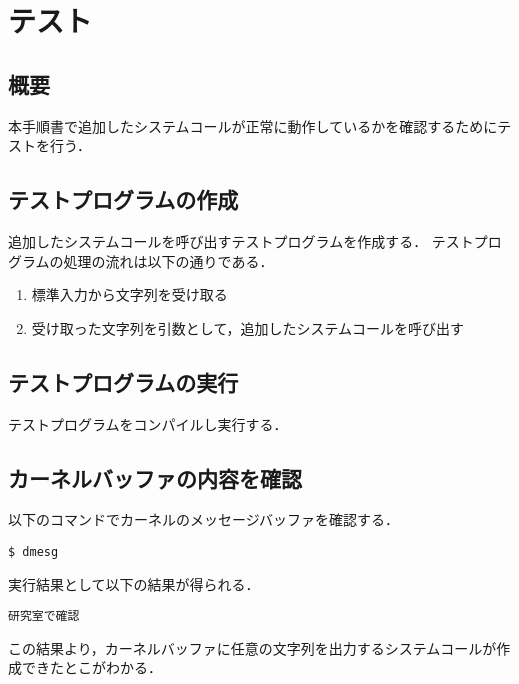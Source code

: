 \documentclass[12pt]{jsarticle}
\begin{document}
\section{テスト}
\subsection{概要}
本手順書で追加したシステムコールが正常に動作しているかを確認するためにテストを行う．

\subsection{テストプログラムの作成}
追加したシステムコールを呼び出すテストプログラムを作成する．
テストプログラムの処理の流れは以下の通りである．
\begin{enumerate}
\item 標準入力から文字列を受け取る
\item 受け取った文字列を引数として，追加したシステムコールを呼び出す 
\end{enumerate}
\subsection{テストプログラムの実行}
テストプログラムをコンパイルし実行する．

\subsection{カーネルバッファの内容を確認}
以下のコマンドでカーネルのメッセージバッファを確認する．
\begin{verbatim}
$ dmesg
\end{verbatim}
実行結果として以下の結果が得られる．
\begin{verbatim}
研究室で確認
\end{verbatim}
この結果より，カーネルバッファに任意の文字列を出力するシステムコールが作成できたとこがわかる．
\end{document}
